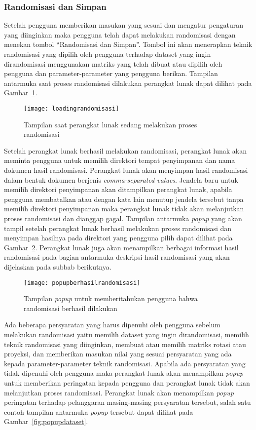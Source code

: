 \subsubsection{Randomisasi dan Simpan}
\label{sec:randomisasisimpan}

Setelah pengguna memberikan masukan yang sesuai dan mengatur pengaturan yang diinginkan maka pengguna telah dapat melakukan randomisasi dengan menekan tombol \textquotedblleft Randomisasi dan Simpan\textquotedblright. Tombol ini akan menerapkan teknik randomisasi yang dipilih oleh pengguna terhadap dataset yang ingin dirandomisasi menggunakan matriks yang telah dibuat atau dipilih oleh pengguna dan parameter-parameter yang pengguna berikan. Tampilan antarmuka saat proses randomisasi dilakukan perangkat lunak dapat dilihat pada Gambar~\ref{fig:loadingrandomisasi}.

\begin{figure}
	\centering
	\texttt{[image: loadingrandomisasi]}
	\caption{Tampilan saat perangkat lunak sedang melakukan proses randomisasi}
	\label{fig:loadingrandomisasi}
\end{figure}

Setelah perangkat lunak berhasil melakukan randomisasi, perangkat lunak akan meminta pengguna untuk memilih direktori tempat penyimpanan dan nama dokumen hasil randomisasi. Perangkat lunak akan menyimpan hasil randomisasi dalam bentuk dokumen berjenis \textit{comma-separated values}. Jendela baru untuk memilih direktori penyimpanan akan ditampilkan perangkat lunak, apabila pengguna membatalkan atau dengan kata lain menutup jendela tersebut tanpa memilih direktori penyimpanan maka perangkat lunak tidak akan melanjutkan proses randomisasi dan dianggap gagal. Tampilan antarmuka \textit{popup} yang akan tampil setelah perangkat lunak berhasil melakukan proses randomisasi dan menyimpan hasilnya pada direktori yang pengguna pilih dapat dilihat pada Gambar~\ref{fig:popupberhasilrandomisasi}. Perangkat lunak juga akan menampilkan berbagai informasi hasil randomisasi pada bagian antarmuka deskripsi hasil randomisasi yang akan dijelaskan pada subbab berikutnya.

\begin{figure}
	\centering
	\texttt{[image: popupberhasilrandomisasi]}
	\caption{Tampilan \textit{popup} untuk memberitahukan pengguna bahwa randomisasi berhasil dilakukan}
	\label{fig:popupberhasilrandomisasi}
\end{figure}

Ada beberapa persyaratan yang harus dipenuhi oleh pengguna sebelum melakukan randomisasi yaitu memilih dataset yang ingin dirandomisasi, memilih teknik randomisasi yang diinginkan, membuat atau memilih matriks rotasi atau proyeksi, dan memberikan masukan nilai yang sesuai persyaratan yang ada kepada parameter-parameter teknik randomisasi. Apabila ada persyaratan yang tidak dipenuhi oleh pengguna maka perangkat lunak akan menampilkan \textit{popup} untuk memberikan peringatan kepada pengguna dan perangkat lunak tidak akan melanjutkan proses randomisasi. Perangkat lunak akan menampilkan \textit{popup} peringatan terhadap pelanggaran masing-masing persyaratan tersebut, salah satu contoh tampilan antarmuka \textit{popup} tersebut dapat dilihat pada Gambar~\ref{fig:popupdataset}.


